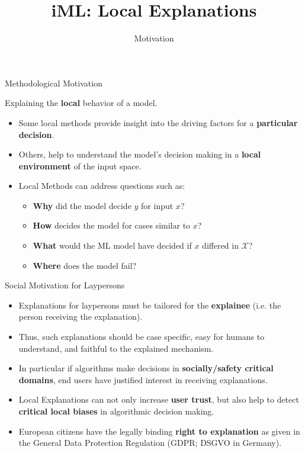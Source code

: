 \documentclass[aspectratio=169]{../latex_main/tntbeamer}  %
\title[Introduction]{iML: Local Explanations}
\subtitle{Motivation}
\begin{document}
	
	\maketitle


\begin{frame}[c]{Methodological Motivation}
 
 Explaining the \textbf{local} behavior of a model.
	\begin{itemize}
		\item Some local methods provide insight into the driving factors for a \textbf{particular decision}. 
		\item Others, help to understand the model's decision making in a \textbf{local environment} of the input space.
		\pause
		\smallskip
		\item Local Methods can address questions such as: 
		\begin{itemize}
		    \item \textbf{Why} did the model decide $y$ for input $x$?
		    \item \textbf{How} decides the model for cases similar to $x$?
		    \item \textbf{What} would the ML model have decided if $x$ differed in $\mathcal{X}$?
		    \item  \textbf{Where} does the model fail?
		\end{itemize}  
	\end{itemize}
\end{frame}

\begin{frame}{Social Motivation for Laypersons}

	\begin{itemize}
		\item Explanations for laypersons must be tailored for the \textbf{explainee} (i.e. the person receiving the explanation).
		\pause\smallskip
		\item Thus, such explanations should be case specific, easy for humans to understand, and faithful to the explained mechanism.
		\pause\smallskip
		\item In particular if algorithms make decisions in \textbf{socially/safety critical domains}, end users have justified interest in receiving explanations.
		\pause\smallskip
		\item Local Explanations can not only increase \textbf{user trust}, but also help to detect \textbf{critical local biases} in algorithmic decision making.
		\pause\smallskip
		\item European citizens have the legally binding \textbf{right to explanation} as given in the General Data Protection Regulation (GDPR; DSGVO in Germany).

	\end{itemize}
\end{frame}
\end{document}
